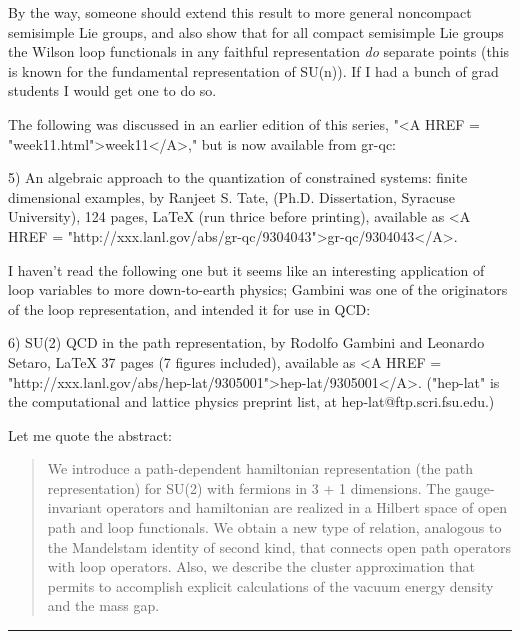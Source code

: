 By the way, someone should extend this result to more general noncompact
semisimple Lie groups, and also show that for all compact semisimple Lie
groups the Wilson loop functionals in any faithful representation \emph{do}
separate points (this is known for the fundamental representation of
SU(n)).  If I had a bunch of grad students I would get one to do so.


The following was discussed in an earlier edition of this series,
"<A HREF = "week11.html">week11</A>," but is now available from gr-qc:

5)  An algebraic approach to the quantization of constrained systems: finite
dimensional examples, by Ranjeet S. Tate, (Ph.D. Dissertation, Syracuse
University), 124 pages, LaTeX (run thrice before printing), available as
<A HREF = "http://xxx.lanl.gov/abs/gr-qc/9304043">gr-qc/9304043</A>.  


I haven't read the following one but it seems like an interesting
application of loop variables to more down-to-earth physics; Gambini was
one of the originators of the loop representation, and intended it for
use in QCD:

6) SU(2) QCD in the path representation, by Rodolfo Gambini and Leonardo
Setaro, LaTeX 37 pages (7 figures included), available as
<A HREF = "http://xxx.lanl.gov/abs/hep-lat/9305001">hep-lat/9305001</A>.  ("hep-lat" is the computational and lattice
physics preprint list, at hep-lat@ftp.scri.fsu.edu.)

Let me quote the abstract:

\begin{quote}
We introduce a path-dependent hamiltonian representation (the path
representation) for SU(2) with fermions in 3 + 1 dimensions. The
gauge-invariant operators and hamiltonian are realized in a Hilbert
space of open path and loop functionals. We obtain a new type of
relation, analogous to the Mandelstam identity of second kind, that
connects open path operators with loop operators. Also, we describe the
cluster approximation that permits to accomplish explicit calculations
of the vacuum energy density and the mass gap.  
\end{quote}
\par\noindent\rule{\textwidth}{0.4pt}

